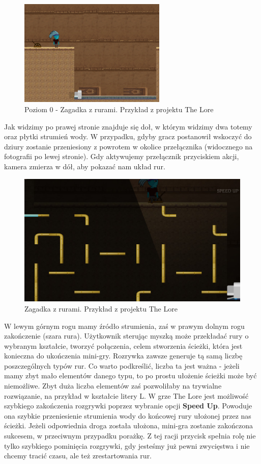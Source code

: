 \documentclass[oneside,polski,logo]{amuthesis}
\begin{document}
\begin{figure}[h]
	\centering
	\includegraphics[width=7cm]{images/tyrek/ruryLvl0.png}
	\caption{Poziom 0 - Zagadka z rurami. Przykład z projektu The Lore}
\end{figure}

Jak widzimy po prawej stronie znajduje się doł, w którym widzimy dwa totemy oraz płytki strumień wody. W przypadku, gdyby gracz postanowił wskoczyć do dziury zostanie przeniesiony z powrotem w okolice przełącznika (widocznego na fotografii po lewej stronie). Gdy aktywujemy przełącznik przyciskiem akcji, kamera zmierza w dół, aby pokazać nam układ rur.

\begin{figure}[h]
	\centering
	\includegraphics[width=12cm]{images/tyrek/pipes.png}
	\caption{Zagadka z rurami. Przykład z projektu The Lore}
\end{figure}

W lewym górnym rogu mamy źródło strumienia, zaś w prawym dolnym rogu zakończenie (szara rura). Użytkownik sterując myszką może przekładać rury o wybranym kształcie, tworzyć połączenia, celem stworzenia ścieżki, która jest konieczna do ukończenia mini-gry. Rozrywka zawsze generuje tą samą liczbę poszczególnych typów rur. Co warto podkreślić, liczba ta jest ważna - jeżeli mamy zbyt mało elementów danego typu, to po prostu ułożenie ścieżki może być niemożliwe. Zbyt duża liczba elementów zaś pozwoliłaby na trywialne rozwiązanie, na przykład w kształcie litery L. W grze The Lore jest możliwość szybkiego zakończenia rozgrywki poprzez wybranie opcji \textbf{Speed Up}. Powoduje ona szybkie przeniesienie strumienia wody do końcowej rury ułożonej przez nas ścieżki. Jeżeli odpowiednia droga została ułożona, mini-gra zostanie zakończona sukcesem, w przeciwnym przypadku porażkę. Z tej racji przycisk spełnia rolę nie tylko szybkiego pominięcia rozgrywki, gdy jesteśmy już pewni zwycięstwa i nie chcemy tracić czasu, ale też zrestartowania rur. 
\end{document}
